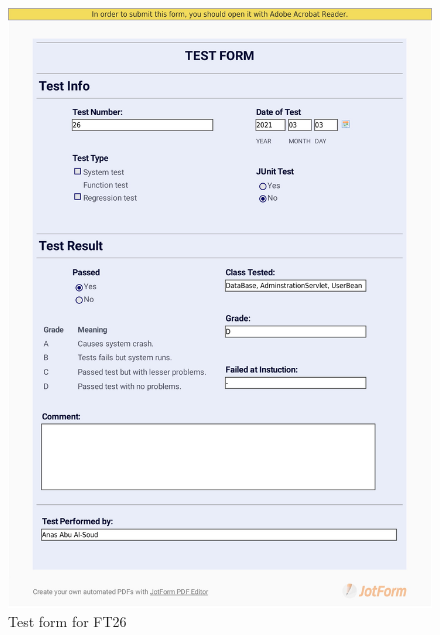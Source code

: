\documentclass{article}
\begin{document}
 \begin{figure}
     \centering
     \includegraphics[width=13cm]{images/2021-03-03_Anas_FT26-1}
     \renewcommand\figurename{Figure}
     \caption{Test form for FT26}
     \label{fig:my_label}
 \end{figure}
 
\end{document}
